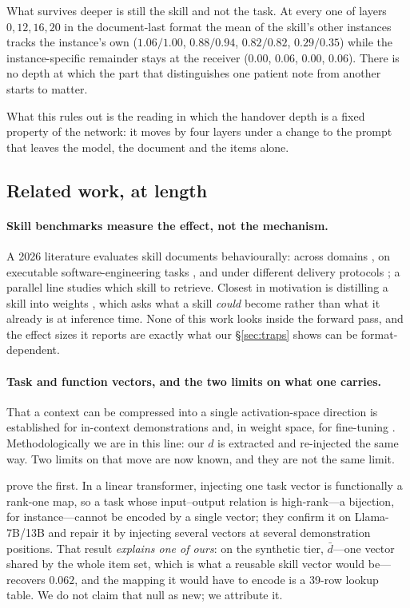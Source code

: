 \documentclass{article}
\newcommand{\dvec}{\ensuremath{d}}
\begin{document}
What survives deeper is still the skill and not the task. At every one of layers
$0, 12, 16, 20$ in the document-last format the mean of the skill's other
instances tracks the instance's own ($1.06/1.00$, $0.88/0.94$, $0.82/0.82$,
$0.29/0.35$) while the instance-specific remainder stays at the receiver
($0.00$, $0.06$, $0.00$, $0.06$). There is no depth at which the part that
distinguishes one patient note from another starts to matter.

What this rules out is the reading in which the handover depth is a fixed
property of the network: it moves by four layers under a change to the prompt
that leaves the model, the document and the items alone.


\subsection{Related work, at length}
\label{app:related}

\paragraph{Skill benchmarks measure the effect, not the mechanism.}
A 2026 literature evaluates skill documents behaviourally: across domains
\citep{skillsbench2026}, on executable software-engineering tasks
\citep{sweskills2026}, and under different delivery protocols
\citep{skillsinjector2026}; a parallel line studies which skill to retrieve.
Closest in motivation is distilling a skill into weights
\citep{skilltolora2026}, which asks what a skill \emph{could} become rather
than what it already is at inference time. None of this work looks inside the
forward pass, and the effect sizes it reports are exactly what our
\S\ref{sec:traps} shows can be format-dependent.

\paragraph{Task and function vectors, and the two limits on what one carries.}
That a context can be compressed into a single activation-space direction is
established for in-context demonstrations \citep{hendel2023taskvectors,
todd2024functionvectors} and, in weight space, for fine-tuning
\citep{ilharco2023taskarithmetic}. Methodologically we are in this line: our
$\dvec$ is extracted and re-injected the same way. Two limits on that move are
now known, and they are not the same limit.

\citet{dong2026taskvectorlimits} prove the first. In a linear transformer,
injecting one task vector is functionally a rank-one map, so a task whose
input--output relation is high-rank---a bijection, for instance---cannot be
encoded by a single vector; they confirm it on Llama-7B/13B and repair it by
injecting several vectors at several demonstration positions. That result
\emph{explains one of ours}: on the synthetic tier, $\bar{\dvec}$---one vector
shared by the whole item set, which is what a reusable skill vector would
be---recovers $0.062$, and the mapping it would have to encode is a 39-row
lookup table. We do not claim that null as new; we attribute it.
\end{document}
